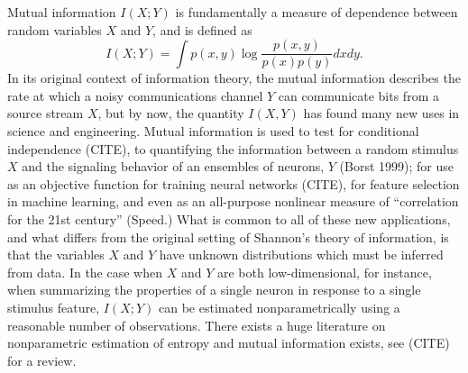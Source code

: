 \documentclass{article}
\begin{document}
Mutual information $I(X; Y)$ is fundamentally a measure of dependence
between random variables $X$ and $Y$, and is defined as
\[
I(X;Y) = \int p(x, y) \log \frac{p(x, y)}{p(x)p(y)}dxdy.
\]
In its original context of information theory, the mutual information
describes the rate at which a noisy communications channel $Y$ can
communicate bits from a source stream $X$, but by now, the quantity
$I(X, Y)$ has found many new uses in science and engineering.  Mutual
information is used to test for conditional independence (CITE), to
quantifying the information between a random stimulus $X$ and the
signaling behavior of an ensembles of neurons, $Y$ (Borst 1999); for
use as an objective function for training neural networks (CITE), for
feature selection in machine learning, and even as an all-purpose
nonlinear measure of ``correlation for the 21st century'' (Speed.)
What is common to all of these new applications, and what differs from
the original setting of Shannon's theory of information, is that the
variables $X$ and $Y$ have unknown distributions which must be
inferred from data.  In the case when $X$ and $Y$ are both
low-dimensional, for instance, when summarizing the properties of a
single neuron in response to a single stimulus feature, $I(X; Y)$ can
be estimated nonparametrically using a reasonable number of
observations.  There exists a huge literature on nonparametric
estimation of entropy and mutual information exists, see (CITE) for a
review.
\end{document}
